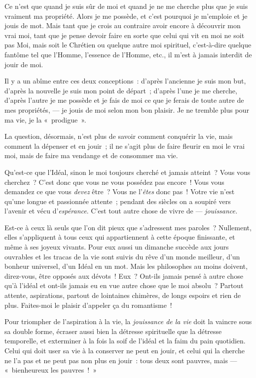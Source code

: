 \documentclass[french,twoside]{book} %
\begin{document}
Ce n’est que quand je suis sûr de moi et quand je ne me cherche plus que je suis vraiment ma propriété. Alors je me possède, et c’est pourquoi je m’emploie et je jouis de mot. Mais tant que je crois au contraire avoir encore à découvrir mon vrai moi, tant que je pense devoir faire en sorte que celui qui vit en moi ne soit pas Moi, mais soit le Chrétien ou quelque autre moi spirituel, c’est-à-dire quelque fantôme tel que l’Homme, l’essence de l’Homme, etc., il m’est à jamais interdit de jouir de moi.\par
Il y a un abîme entre ces deux conceptions : d’après l’ancienne je suis mon but, d’après la nouvelle je suis mon point de départ ; d’après l’une je me cherche, d’après l’autre je me possède et je fais de moi ce que je ferais de toute autre de mes propriétés, — je jouis  de moi selon mon bon plaisir. Je ne tremble plus pour ma vie, je la « prodigue ».\par
La question, désormais, n’est plus de savoir comment conquérir la vie, mais comment la dépenser et en jouir ; il ne s’agit plus de faire fleurir en moi le vrai moi, mais de faire ma vendange et de consommer ma vie.\par
Qu’est-ce que l’Idéal, sinon le moi toujours cherché et jamais atteint ? Vous vous cherchez ? C’est donc que vous ne vous possédez pas encore ! Vous vous demandez ce que vous \emph{devez} être ? Vous ne l’\emph{êtes} donc pas ! Votre vie n’est qu’une longue et passionnée attente ; pendant des siècles on a soupiré vers l’avenir et vécu d’\emph{espérance}. C’est tout autre chose de vivre de — \emph{jouissance.}\par
Est-ce à ceux là seuls que l’on dit pieux que s’adressent mes paroles ? Nullement, elles s’appliquent à tous ceux qui appartiennent à cette époque finissante, et même à ses joyeux vivants. Pour eux aussi un dimanche succède aux jours ouvrables et les tracas de la vie sont suivis du rêve d’un monde meilleur, d’un bonheur universel, d’un Idéal en un mot. Mais les philosophes au moins doivent, direz-vous, être opposés aux dévots ! Eux ? Ont-ils jamais pensé à autre chose qu’à l’idéal et ont-ils jamais eu en vue autre chose que le moi absolu ? Partout attente, aspirations, partout de lointaines chimères, de longs espoirs et rien de plus. Faites-moi le plaisir d’appeler ça du romantisme !\par
Pour triompher de l’aspiration à la vie, la \emph{jouissance de la vie} doit la vaincre sous sa double forme, écraser aussi bien la détresse spirituelle que la détresse temporelle, et exterminer à la fois la soif de l’idéal et la faim du pain quotidien. Celui qui doit user sa vie à la conserver ne peut en jouir, et celui qui la cherche ne l’a pas et ne peut pas non plus en jouir : tous deux sont pauvres, mais — « bienheureux les pauvres ! »\par
\end{document}
